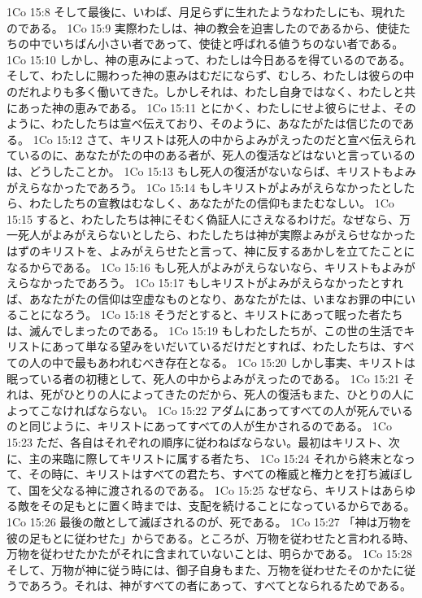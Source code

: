 1Co 15:8  そして最後に、いわば、月足らずに生れたようなわたしにも、現れたのである。
1Co 15:9  実際わたしは、神の教会を迫害したのであるから、使徒たちの中でいちばん小さい者であって、使徒と呼ばれる値うちのない者である。
1Co 15:10  しかし、神の恵みによって、わたしは今日あるを得ているのである。そして、わたしに賜わった神の恵みはむだにならず、むしろ、わたしは彼らの中のだれよりも多く働いてきた。しかしそれは、わたし自身ではなく、わたしと共にあった神の恵みである。
1Co 15:11  とにかく、わたしにせよ彼らにせよ、そのように、わたしたちは宣べ伝えており、そのように、あなたがたは信じたのである。
1Co 15:12  さて、キリストは死人の中からよみがえったのだと宣べ伝えられているのに、あなたがたの中のある者が、死人の復活などはないと言っているのは、どうしたことか。
1Co 15:13  もし死人の復活がないならば、キリストもよみがえらなかったであろう。
1Co 15:14  もしキリストがよみがえらなかったとしたら、わたしたちの宣教はむなしく、あなたがたの信仰もまたむなしい。
1Co 15:15  すると、わたしたちは神にそむく偽証人にさえなるわけだ。なぜなら、万一死人がよみがえらないとしたら、わたしたちは神が実際よみがえらせなかったはずのキリストを、よみがえらせたと言って、神に反するあかしを立てたことになるからである。
1Co 15:16  もし死人がよみがえらないなら、キリストもよみがえらなかったであろう。
1Co 15:17  もしキリストがよみがえらなかったとすれば、あなたがたの信仰は空虚なものとなり、あなたがたは、いまなお罪の中にいることになろう。
1Co 15:18  そうだとすると、キリストにあって眠った者たちは、滅んでしまったのである。
1Co 15:19  もしわたしたちが、この世の生活でキリストにあって単なる望みをいだいているだけだとすれば、わたしたちは、すべての人の中で最もあわれむべき存在となる。
1Co 15:20  しかし事実、キリストは眠っている者の初穂として、死人の中からよみがえったのである。
1Co 15:21  それは、死がひとりの人によってきたのだから、死人の復活もまた、ひとりの人によってこなければならない。
1Co 15:22  アダムにあってすべての人が死んでいるのと同じように、キリストにあってすべての人が生かされるのである。
1Co 15:23  ただ、各自はそれぞれの順序に従わねばならない。最初はキリスト、次に、主の来臨に際してキリストに属する者たち、
1Co 15:24  それから終末となって、その時に、キリストはすべての君たち、すべての権威と権力とを打ち滅ぼして、国を父なる神に渡されるのである。
1Co 15:25  なぜなら、キリストはあらゆる敵をその足もとに置く時までは、支配を続けることになっているからである。
1Co 15:26  最後の敵として滅ぼされるのが、死である。
1Co 15:27  「神は万物を彼の足もとに従わせた」からである。ところが、万物を従わせたと言われる時、万物を従わせたかたがそれに含まれていないことは、明らかである。
1Co 15:28  そして、万物が神に従う時には、御子自身もまた、万物を従わせたそのかたに従うであろう。それは、神がすべての者にあって、すべてとなられるためである。
